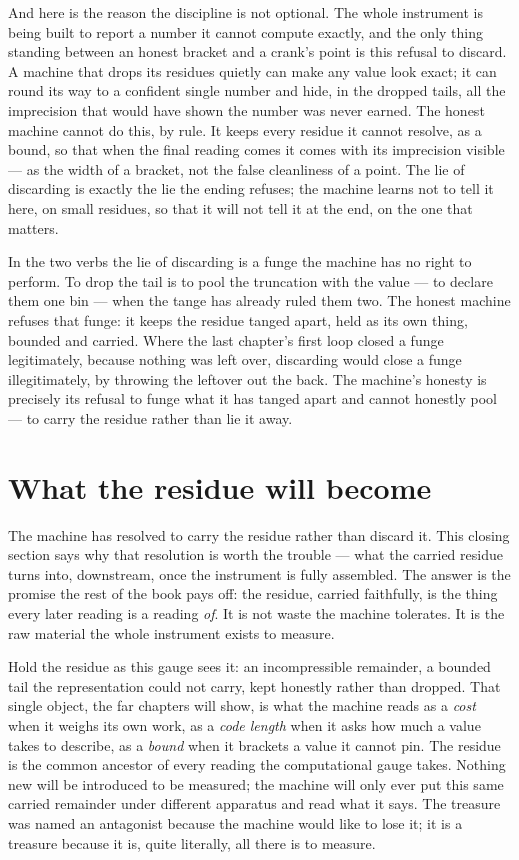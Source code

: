 And here is the reason the discipline is not optional. The whole instrument is being built to report a number it cannot
compute exactly, and the only thing standing between an honest bracket and a crank's point is this refusal to discard.
A machine that drops its residues quietly can make any value look exact; it can round its way to a confident single
number and hide, in the dropped tails, all the imprecision that would have shown the number was never earned. The honest
machine cannot do this, by rule. It keeps every residue it cannot resolve, as a bound, so that when the final reading
comes it comes with its imprecision visible --- as the width of a bracket, not the false cleanliness of a point. The lie
of discarding is exactly the lie the ending refuses; the machine learns not to tell it here, on small residues, so that
it will not tell it at the end, on the one that matters.

In the two verbs the lie of discarding is a funge the machine has no right to perform. To drop the tail is to pool the
truncation with the value --- to declare them one bin --- when the tange has already ruled them two. The honest machine
refuses that funge: it keeps the residue tanged apart, held as its own thing, bounded and carried. Where the last
chapter's first loop closed a funge legitimately, because nothing was left over, discarding would close a funge
illegitimately, by throwing the leftover out the back. The machine's honesty is precisely its refusal to funge what it
has tanged apart and cannot honestly pool --- to carry the residue rather than lie it away.

\section{What the residue will become}

The machine has resolved to carry the residue rather than discard it. This closing section says why that resolution is
worth the trouble --- what the carried residue turns into, downstream, once the instrument is fully assembled. The
answer is the promise the rest of the book pays off: the residue, carried faithfully, is the thing every later reading
is a reading \emph{of}. It is not waste the machine tolerates. It is the raw material the whole instrument exists to
measure.

Hold the residue as this gauge sees it: an incompressible remainder, a bounded tail the representation could not carry,
kept honestly rather than dropped. That single object, the far chapters will show, is what the machine reads as a
\emph{cost} when it weighs its own work, as a \emph{code length} when it asks how much a value takes to describe, as a
\emph{bound} when it brackets a value it cannot pin. The residue is the common ancestor of every reading the
computational gauge takes. Nothing new will be introduced to be measured; the machine will only ever put this same
carried remainder under different apparatus and read what it says. The treasure was named an antagonist because the
machine would like to lose it; it is a treasure because it is, quite literally, all there is to measure.

